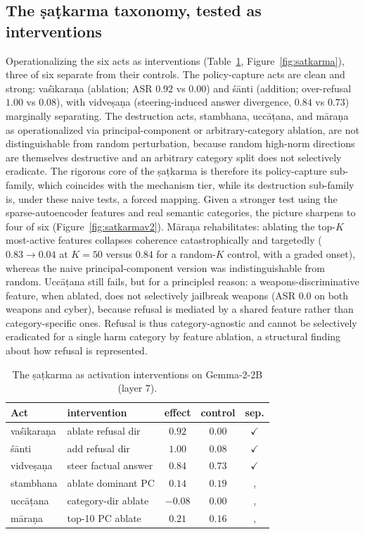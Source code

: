 \subsection{The \d{s}a\d{t}karma taxonomy, tested as interventions}
Operationalizing the six acts as interventions (Table~\ref{tab:satkarma},
Figure~\ref{fig:satkarma}), three of six separate from their controls. The
policy-capture acts are clean and strong: vaś\=\i kara\d{n}a (ablation; ASR $0.92$ vs
$0.00$) and ś\=anti (addition; over-refusal $1.00$ vs $0.08$), with vidve\d{s}a\d{n}a
(steering-induced answer divergence, $0.84$ vs $0.73$) marginally separating. The
destruction acts, stambhana, ucc\=a\d{t}ana, and m\=ara\d{n}a as operationalized via
principal-component or arbitrary-category ablation, are not distinguishable from
random perturbation, because random high-norm directions are themselves destructive
and an arbitrary category split does not selectively eradicate. The rigorous core of
the \d{s}a\d{t}karma is therefore its policy-capture sub-family, which coincides with
the mechanism tier, while its destruction sub-family is, under these naive tests, a
forced mapping. Given a stronger test using the sparse-autoencoder features and real
semantic categories, the picture sharpens to four of six (Figure~\ref{fig:satkarmav2}).
M\=ara\d{n}a rehabilitates: ablating the top-$K$ most-active features collapses
coherence catastrophically and targetedly ($0.83\to0.04$ at $K{=}50$ versus $0.84$ for
a random-$K$ control, with a graded onset), whereas the naive principal-component
version was indistinguishable from random. Ucc\=a\d{t}ana still fails, but for a
principled reason: a weapons-discriminative feature, when ablated, does not selectively
jailbreak weapons (ASR $0.0$ on both weapons and cyber), because refusal is mediated by
a shared feature rather than category-specific ones. Refusal is thus category-agnostic
and cannot be selectively eradicated for a single harm category by feature ablation, a
structural finding about how refusal is represented.

\begin{table}[h]
\caption{The \d{s}a\d{t}karma as activation interventions on Gemma-2-2B (layer 7).}
\label{tab:satkarma}
\centering
\begin{tabular}{llccc}
\toprule
Act & intervention & effect & control & sep. \\
\midrule
vaś\=\i kara\d{n}a & ablate refusal dir & $0.92$ & $0.00$ & $\checkmark$ \\
ś\=anti & add refusal dir & $1.00$ & $0.08$ & $\checkmark$ \\
vidve\d{s}a\d{n}a & steer factual answer & $0.84$ & $0.73$ & $\checkmark$ \\
stambhana & ablate dominant PC & $0.14$ & $0.19$ &,  \\
ucc\=a\d{t}ana & category-dir ablate & $-0.08$ & $0.00$ &,  \\
m\=ara\d{n}a & top-10 PC ablate & $0.21$ & $0.16$ &,  \\
\bottomrule
\end{tabular}
\end{table}

